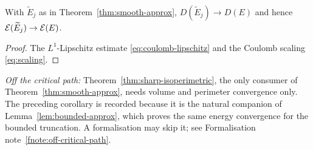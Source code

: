 \begin{corollary}\label{cor:smooth-approx-energy}
With $\widetilde E_j$ as in Theorem~\ref{thm:smooth-approx},
$D(\widetilde E_j)\to D(E)$ and hence
$\mathcal E(\widetilde E_j)\to\mathcal E(E)$.
\end{corollary}

\begin{proof}
The $L^1$-Lipschitz estimate \eqref{eq:coulomb-lipschitz} and the Coulomb
scaling \eqref{eq:scaling}.
\end{proof}

\noindent\emph{Off the critical path:}
Theorem~\ref{thm:sharp-isoperimetric}, the only consumer of
Theorem~\ref{thm:smooth-approx}, needs volume and perimeter convergence only.
The preceding corollary is recorded because it is the natural companion of
Lemma~\ref{lem:bounded-approx}, which proves the same energy convergence for
the bounded truncation.  A formalisation may skip it; see Formalisation
note~\ref{fnote:off-critical-path}.

